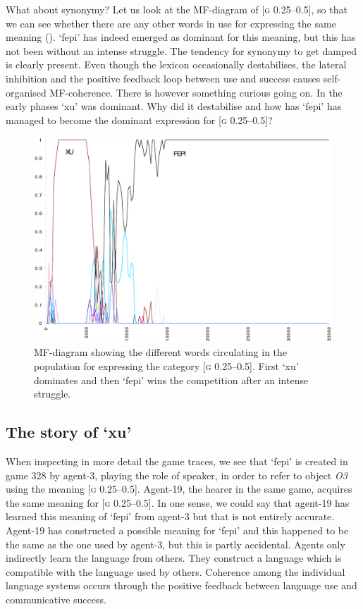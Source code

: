 What about synonymy? Let us look at the 
MF-diagram of [\textsc{g} 0.25–0.5], so that we can
see whether there are any other words in use for expressing
the same meaning ().
`fepi' has indeed emerged as dominant for this meaning, but 
this has not been without an intense struggle.
The tendency for synonymy to get damped is clearly present. 
Even though the lexicon occasionally destabilises, 
the lateral inhibition and the positive feedback loop between use 
and success causes self-organised MF-coherence. 
There is however something curious going on. 
In the early phases `xu' was dominant. Why did it 
destabilise and how has `fepi' has managed to become the
dominant expression for [\textsc{g} 0.25–0.5]? 

\begin{figure}[htbp]
  \centerline{\includegraphics[width=.80\textwidth]{chap7/figs/MF-G-025-050.pdf}}
\caption{\label{g0d2505.f}MF-diagram showing the
different words circulating in the population for expressing
the category [\textsc{g} 0.25–0.5]. First `xu' dominates and 
then `fepi' wins the competition after an intense struggle.}
\end{figure}

\subsection{The story of `xu'}

When inspecting in more detail the game traces,
we see that `fepi' is created in game 328 by agent-3, playing the
role of speaker, in order to refer to object \emph{O3} using 
the meaning [\textsc{g} 0.25–0.5]. Agent-19, the hearer in the same 
game, acquires the same meaning for [\textsc{g} 0.25–0.5]. In one sense,
we could say that agent-19 has learned this meaning of `fepi' from
agent-3 but that is not entirely accurate. Agent-19 
has constructed a possible meaning for `fepi' and this happened
to be the same as the one used by agent-3,
but this is partly accidental. 
Agents only indirectly learn the language from others. They construct
a language which is compatible with the language used by others. 
Coherence among the individual
language systems occurs through the positive feedback between
language use and communicative success.

